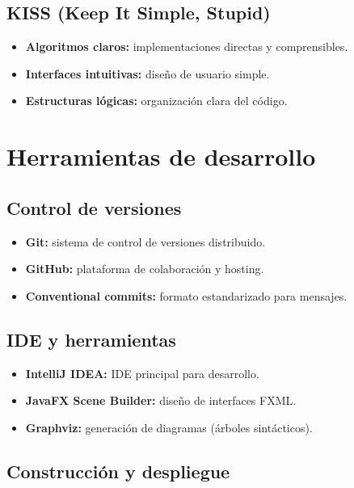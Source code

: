 \subsection{KISS (Keep It Simple, Stupid)}

\begin{itemize}
    \item \textbf{Algoritmos claros:} implementaciones directas y comprensibles.
    \item \textbf{Interfaces intuitivas:} diseño de usuario simple.
    \item \textbf{Estructuras lógicas:} organización clara del código.
\end{itemize}

\section{Herramientas de desarrollo}

\subsection{Control de versiones}

\begin{itemize}
    \item \textbf{Git:} sistema de control de versiones distribuido.
    \item \textbf{GitHub:} plataforma de colaboración y hosting.
    \item \textbf{Conventional commits:} formato estandarizado para mensajes.
\end{itemize}

\subsection{IDE y herramientas}

\begin{itemize}
    \item \textbf{IntelliJ IDEA:} IDE principal para desarrollo.
    \item \textbf{JavaFX Scene Builder:} diseño de interfaces FXML.
    \item \textbf{Graphviz:} generación de diagramas (árboles sintácticos).
\end{itemize}

\subsection{Construcción y despliegue}

